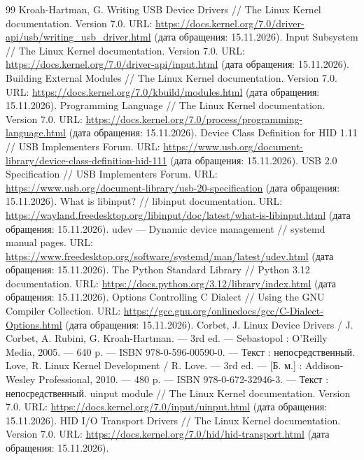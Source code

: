 {}
\begingroup
\raggedright
\small
\begin{thebibliography}{99}
 Kroah-Hartman, G. Writing USB Device Drivers // The Linux Kernel documentation. Version 7.0. URL: \url{https://docs.kernel.org/7.0/driver-api/usb/writing_usb_driver.html} (дата обращения: 15.11.2026).
 Input Subsystem // The Linux Kernel documentation. Version 7.0. URL: \url{https://docs.kernel.org/7.0/driver-api/input.html} (дата обращения: 15.11.2026).
 Building External Modules // The Linux Kernel documentation. Version 7.0. URL: \url{https://docs.kernel.org/7.0/kbuild/modules.html} (дата обращения: 15.11.2026).
 Programming Language // The Linux Kernel documentation. Version 7.0. URL: \url{https://docs.kernel.org/7.0/process/programming-language.html} (дата обращения: 15.11.2026).
 Device Class Definition for HID 1.11 // USB Implementers Forum. URL: \url{https://www.usb.org/document-library/device-class-definition-hid-111} (дата обращения: 15.11.2026).
 USB 2.0 Specification // USB Implementers Forum. URL: \url{https://www.usb.org/document-library/usb-20-specification} (дата обращения: 15.11.2026).
 What is libinput? // libinput documentation. URL: \url{https://wayland.freedesktop.org/libinput/doc/latest/what-is-libinput.html} (дата обращения: 15.11.2026).
 udev --- Dynamic device management // systemd manual pages. URL: \url{https://www.freedesktop.org/software/systemd/man/latest/udev.html} (дата обращения: 15.11.2026).
 The Python Standard Library // Python 3.12 documentation. URL: \url{https://docs.python.org/3.12/library/index.html} (дата обращения: 15.11.2026).
 Options Controlling C Dialect // Using the GNU Compiler Collection. URL: \url{https://gcc.gnu.org/onlinedocs/gcc/C-Dialect-Options.html} (дата обращения: 15.11.2026).
 Corbet, J. Linux Device Drivers / J. Corbet, A. Rubini, G. Kroah-Hartman. --- 3rd ed. --- Sebastopol : O'Reilly Media, 2005. --- 640 p. --- ISBN 978-0-596-00590-0. --- Текст : непосредственный.
 Love, R. Linux Kernel Development / R. Love. --- 3rd ed. --- [Б. м.] : Addison-Wesley Professional, 2010. --- 480 p. --- ISBN 978-0-672-32946-3. --- Текст : непосредственный.
 uinput module // The Linux Kernel documentation. Version 7.0. URL: \url{https://docs.kernel.org/7.0/input/uinput.html} (дата обращения: 15.11.2026).
 HID I/O Transport Drivers // The Linux Kernel documentation. Version 7.0. URL: \url{https://docs.kernel.org/7.0/hid/hid-transport.html} (дата обращения: 15.11.2026).

\end{thebibliography}
